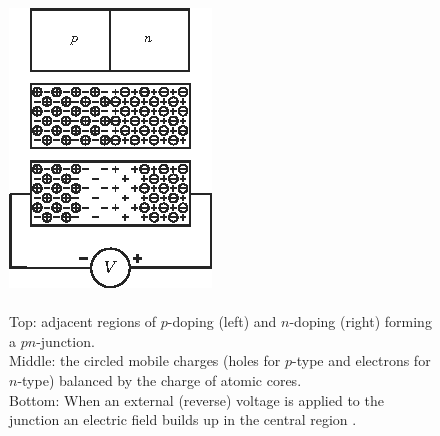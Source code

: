 \begin{figure}[!h]
    \begin{minipage}[c]{.25\linewidth}
        \includegraphics[width=1\linewidth]{Images/LGADs/p-n junction with voltage.png}
    \end{minipage}
    \hfill
    \begin{minipage}[c]{.6\linewidth}
        \caption{\\Top: adjacent regions of $p$-doping (left) and $n$-doping (right) forming a $pn$-junction.\\
        Middle: the circled mobile charges (holes for $p$-type and electrons for $n$-type) balanced by the charge of atomic cores.\\
        Bottom: When an external (reverse) voltage is applied to the junction an electric field builds up in the central region \cite{10.1093/acprof:oso/9780198527848.003.0001}.}
        \label{fig:p-n_junction_reverse_bias_voltage}
    \end{minipage}
\end{figure} 

